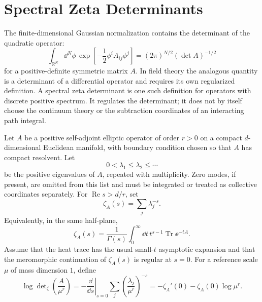 \section{Spectral Zeta Determinants}
\label{sec:spectral-zeta-determinants}

The finite-dimensional Gaussian normalization contains the determinant of the
quadratic operator:
\[
  \int_{\mathbb R^N}\dd^N\phi\,
  \exp\left[-\frac12\phi^iA_{ij}\phi^j\right]
  =
  (2\pi)^{N/2}(\det A)^{-1/2}
\]
for a positive-definite symmetric matrix \(A\).  In field theory the analogous
quantity is a determinant of a differential operator and requires its own
regularized definition.  A spectral zeta determinant is one such definition
for operators with discrete positive spectrum.  It regulates the determinant;
it does not by itself choose the continuum theory or the subtraction
coordinates of an interacting path integral.

\begin{definition}
\label{def:spectral-zeta-determinant}
Let \(A\) be a positive self-adjoint elliptic operator of order \(r>0\) on a
compact \(d\)-dimensional Euclidean manifold, with boundary condition chosen so
that \(A\) has compact resolvent.  Let
\[
  0<\lambda_1\le\lambda_2\le\cdots
\]
be the positive eigenvalues of \(A\), repeated with multiplicity.  Zero modes,
if present, are omitted from this list and must be integrated or treated as
collective coordinates separately.  For \(\operatorname{Re}s>d/r\), set
\begin{equation}
  \zeta_A(s)=\sum_j \lambda_j^{-s}.
  \label{eq:spectral-zeta-definition}
\end{equation}
Equivalently, in the same half-plane,
\begin{equation}
  \zeta_A(s)
  =
  \frac{1}{\Gamma(s)}
  \int_0^\infty \dd t\,t^{s-1}
  \operatorname{Tr}\ee^{-tA}.
  \label{eq:spectral-zeta-heat-kernel-mellin}
\end{equation}
Assume that the heat trace has the usual small-\(t\) asymptotic expansion and
that the meromorphic continuation of \(\zeta_A(s)\) is regular at \(s=0\).
For a reference scale \(\mu\) of mass dimension \(1\), define
\begin{equation}
  \log\det\nolimits_{\zeta}\left(\frac{A}{\mu^r}\right)
  =
  -
  \left.\frac{\dd}{\dd s}\right|_{s=0}
  \sum_j\left(\frac{\lambda_j}{\mu^r}\right)^{-s}
  =
  -\zeta_A'(0)-\zeta_A(0)\log\mu^r .
  \label{eq:zeta-determinant-definition}
\end{equation}
\end{definition}

